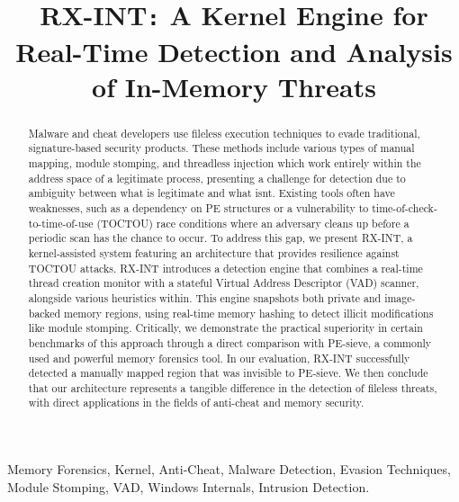 \documentclass[journal]{IEEEtran}
\title{RX-INT\texttt{:} A Kernel Engine for Real-Time Detection and Analysis of In-Memory Threats}
\author{
    \IEEEauthorblockN{Arjun Juneja \\}
    \IEEEauthorblockA{School of Electronics and Computer Science\\
    University of Southampton\\
    aj2g24@soton.ac.uk}
}
\begin{document}
\maketitle

\begin{abstract}
Malware and cheat developers use fileless execution techniques to evade traditional, signature-based security products. These methods include various types of manual mapping, module stomping, and threadless injection which work entirely within the address space of a legitimate process, presenting a challenge for detection due to ambiguity between what is legitimate and what isnt. Existing tools often have weaknesses, such as a dependency on PE structures or a vulnerability to time-of-check-to-time-of-use (TOCTOU) race conditions where an adversary cleans up before a periodic scan has the chance to occur. To address this gap, we present RX-INT, a kernel-assisted system featuring an architecture that provides resilience against TOCTOU attacks. RX-INT introduces a detection engine that combines a real-time thread creation monitor with a stateful Virtual Address Descriptor (VAD) scanner, alongside various heuristics within. This engine snapshots both private and image-backed memory regions, using real-time memory hashing to detect illicit modifications like module stomping. Critically, we demonstrate the practical superiority in certain benchmarks of this approach through a direct comparison with PE-sieve, a commonly used and powerful memory forensics tool. In our evaluation, RX-INT successfully detected a manually mapped region that was invisible to PE-sieve. We then conclude that our architecture represents a tangible difference in the detection of fileless threats, with direct applications in the fields of anti-cheat and memory security.
\end{abstract}

\begin{IEEEkeywords}
Memory Forensics, Kernel, Anti-Cheat, Malware Detection, Evasion Techniques, Module Stomping, VAD, Windows Internals, Intrusion Detection.
\end{IEEEkeywords}
\end{document}
